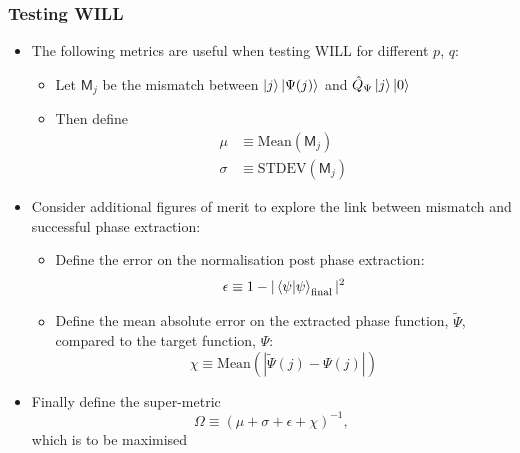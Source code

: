 \documentclass{beamer}
\begin{document}
\begin{frame}
\frametitle{Testing WILL}
\begin{itemize}
\item The following metrics are useful when testing WILL for different $p$, $q$:
\begin{itemize}
\item Let $\mathsf{M}_j$ be the \alert{mismatch} between $\ket{j} \ket{\Psi(j)}$ and $\hat{Q}_\Psi \ket{j}\ket{0}$
\item Then define 
\begin{align}
\mu &\equiv \text{Mean}(\mathsf{M}_j) \\
\sigma &\equiv \text{STDEV}(\mathsf{M}_j)
\end{align}
\end{itemize}
\item Consider additional figures of merit to explore the \alert{link between mismatch and successful phase extraction}:
\begin{itemize}
\item Define the \alert{error on the normalisation} post phase extraction: 
\begin{equation}
\epsilon \equiv 1 - |\braket{\psi | \psi}_\text{final}|^2 
\end{equation}
\item Define the mean absolute \alert{error on the extracted phase function}, $\tilde{\Psi}$, compared to the target function, $\Psi$: 
\begin{equation}
\chi \equiv \text{Mean}(|\tilde{\Psi}(j) - \Psi(j)|)
\end{equation}
\end{itemize}
\item Finally define the \alert{super-metric} 
\begin{equation}
\Omega \equiv \left( \mu + \sigma + \epsilon + \chi \right)^{-1},
\end{equation}
which is to be maximised
\end{itemize}
\end{frame}
\end{document}
